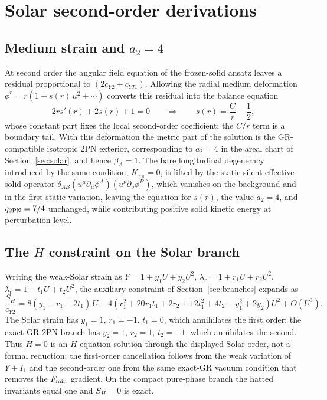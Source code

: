 \documentclass[12pt,a4paper]{article}
\begin{document}
\section{Solar second-order derivations}
\label{app:solar}

\subsection*{Medium strain and $a_2=4$}

At second order the angular field equation of the frozen-solid ansatz leaves
a residual proportional to $(2c_{Y2}+c_{YI1})$. Allowing the radial medium
deformation $\phi^r=r(1+s(r)\,u^2+\cdots)$ converts this residual into the
balance equation
\[
2rs'(r)+2s(r)+1=0
\qquad\Longrightarrow\qquad
s(r)=\frac{C}{r}-\frac12 ,
\]
whose constant part fixes the local second-order coefficient; the $C/r$ term
is a boundary tail. With this deformation the metric part of the solution is
the GR-compatible isotropic $2$PN exterior, corresponding to $a_2=4$ in the
areal chart of Section~\ref{sec:solar}, and hence $\beta_A=1$. The bare
longitudinal degeneracy introduced by the same condition,
$K_{\pi\pi}=0$, is lifted by the static-silent effective-solid operator
$\delta_{AB}(u^\mu\partial_\mu\phi^A)(u^\nu\partial_\nu\phi^B)$, which
vanishes on the background and in the first static variation, leaving the
equation for $s(r)$, the value $a_2=4$, and $q_{2{\rm PN}}=7/4$ unchanged,
while contributing positive solid kinetic energy at perturbation level.

\subsection*{The $H$ constraint on the Solar branch}

Writing the weak-Solar strain as $Y=1+y_1U+y_2U^2$,
$\lambda_r=1+r_1U+r_2U^2$, $\lambda_t=1+t_1U+t_2U^2$, the auxiliary
constraint of Section~\ref{sec:branches} expands as
\[
\frac{S_H}{c_{Y2}}
=8(y_1+r_1+2t_1)\,U
+4\left(r_1^2+20r_1t_1+2r_2+12t_1^2+4t_2-y_1^2+2y_2\right)U^2
+O(U^3).
\]
The Solar strain has $y_1=1$, $r_1=-1$, $t_1=0$, which annihilates the first
order; the exact-GR $2$PN branch has $y_2=1$, $r_2=1$, $t_2=-1$, which
annihilates the second. Thus $H=0$ is an $H$-equation solution through the
displayed Solar order, not a formal reduction; the first-order cancellation
follows from the weak variation of $Y+I_1$ and the second-order one from the
same exact-GR vacuum condition that removes the $F_{\rm min}$ gradient. On
the compact pure-phase branch the hatted invariants equal one and $S_H=0$ is
exact.
\end{document}
